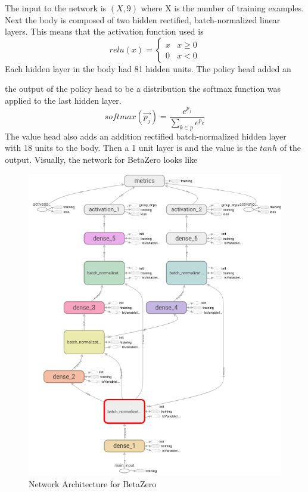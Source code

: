 \documentclass[letterpaper]{article} %
\begin{document}
  The input to the network is $(X, 9)$ where X is the number of training
  examples. Next the body is composed of two hidden rectified, batch-normalized
  linear layers. This means that the activation function used is
  \[relu(x) = \begin{cases}x & x \ge 0 \\ 0 & x<0\end{cases}\]
  Each hidden layer in the body had 81 hidden units. The policy head added an
  
  the output of the policy head to be a distribution the softmax function was
  applied to the last hidden layer.
  \[softmax(\vec{p_j}) = \frac{e^{p_j}}{ \sum_{k \in p}e^{p_k}}\]
  The value head also adds an addition rectified batch-normalized hidden layer
  with 18 units to the body. Then a 1 unit layer is and the value is the $tanh$
  of the output. Visually, the network for BetaZero looks like
  \begin{figure}[!htb]
    \centering
    \includegraphics[scale=0.5]{./nn.png} 
    \caption{Network Architecture for BetaZero}
  \end{figure}
\end{document}
